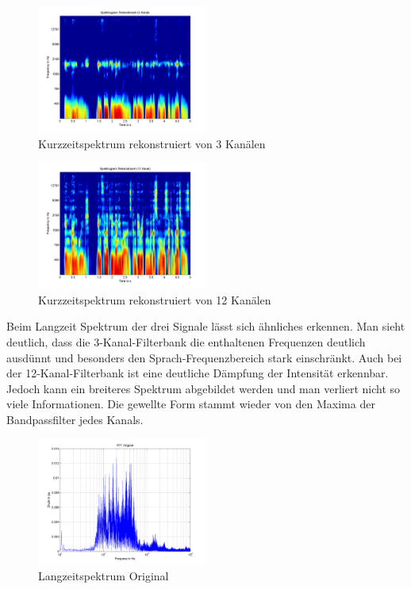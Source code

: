 \documentclass[conference]{IEEEtran}
\begin{document}
\begin{compactenum}[a)]
\begin{figure}[h!]
	\centering
	\includegraphics[width=0.5\textwidth]{img/spect_rec_3.png}
	\caption{Kurzzeitspektrum rekonstruiert von 3 Kanälen}
	\label{fig:spect-rec-3}
\end{figure}

\begin{figure}[h!]
	\centering
	\includegraphics[width=0.5\textwidth]{img/spect_rec_12.png}
	\caption{Kurzzeitspektrum rekonstruiert von 12 Kanälen}
	\label{fig:spect-rec-12}
\end{figure}

\item Beim Langzeit Spektrum der drei Signale lässt sich ähnliches erkennen. Man sieht deutlich, dass die 3-Kanal-Filterbank die enthaltenen Frequenzen deutlich ausdünnt und besonders den Sprach-Frequenzbereich stark einschränkt. Auch bei der 12-Kanal-Filterbank ist eine deutliche Dämpfung der Intensität erkennbar. Jedoch kann ein breiteres Spektrum abgebildet werden und man verliert nicht so viele Informationen. Die gewellte Form stammt wieder von den Maxima der Bandpassfilter jedes Kanals.
\begin{figure}[h!]
	\centering
	\includegraphics[width=0.5\textwidth]{img/fft_orig.png}
	\caption{Langzeitspektrum Original}
	\label{fig:fft-orig}
\end{figure}


\end{compactenum}
\end{document}
